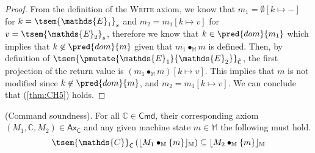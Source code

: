 {\begin{proof}
From the definition of the \textsc{Write} axiom, we know that $m_1 = \emptyset[k \mapsto -]$ for $k = \tsem{\mathds{E}_1}_s$ and $m_2 = m_1[k \mapsto v]$ for $v = \tsem{\mathds{E}_2}_s$, therefore we know that $k \in \pred{dom}{m_1}$ which implies that $k \not\in \pred{dom}{m}$ given that $m_1 \bullet_\mathbb{M} m$ is defined. Then, by definition of $\tsem{\pmutate{\mathds{E}_1}{\mathds{E}_2}}_{\hat{\mathsf{C}}}$, the first projection of the return value is $(m_1 \bullet_\mathbb{M} m)[k \mapsto v]$. This implies that $m$ is not modified since $k \not\in \pred{dom}{m}$, and $m_2 = m_1[k \mapsto v]$. We can conclude that (\ref{thm:CH5}) holds.
\end{proof}
}

\thm \label{thm:cSound} (Command soundness). For all $\mathds{C} \in \mathsf{Cmd}$, their corresponding axiom $(M_1, \mathds{C}, M_2) \in \mathsf{Ax}_\mathsf{C}$ and any given machine state $m \in \mathbb{M}$ the following must hold.
\[
	\tsem{\mathds{C}}_\mathsf{C} \left( \lfloor M_1 \bullet_\mathbb{M} \{m\} \rfloor_\mathbb{M} \right) \subseteq \lfloor M_2 \bullet_\mathbb{M} \{m\} \rfloor_\mathbb{M}
\]

